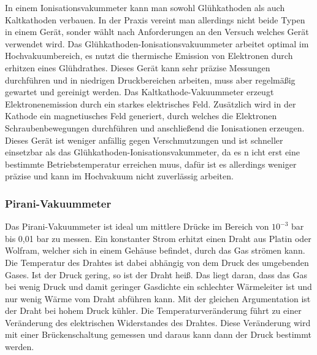 In einem Ionisationsvakummeter kann man sowohl Glühkathoden als auch Kaltkathoden verbauen. In der Praxis 
vereint man allerdings nicht  beide Typen in einem Gerät, sonder wählt nach Anforderungen an den Versuch welches
Gerät verwendet wird. Das Glühkathoden-Ionisationsvakuummeter arbeitet optimal im Hochvakuumbereich, es nutzt die thermische Emission von Elektronen
durch erhitzen eines Glühdrathes. Dieses Gerät kann sehr präzise Messungen durchführen und in niedrigen Druckbereichen arbeiten,
muss aber regelmäßig gewartet und gereinigt werden. Das Kaltkathode-Vakuummeter erzeugt Elektronenemission durch ein starkes elektrisches Feld.
Zusätzlich wird in der Kathode ein magnetiusches Feld generiert, durch welches die Elektronen Schraubenbewegungen durchführen und anschließend die
Ionisationen  erzeugen. Dieses Gerät ist weniger anfällig gegen Verschmutzungen und ist schneller einsetzbar als das Glühkathoden-Ionisationsvakummeter,
da es n icht erst eine bestimmte Betriebstemperatur erreichen muus, dafür ist es allerdings weniger präzise und kann im Hochvakuum nicht zuverlässig arbeiten.


\subsubsection{Pirani-Vakuummeter}
Das Pirani-Vakuummeter ist ideal um mittlere Drücke im Bereich von $10^{-3}$ bar bis 0,01 bar zu messen.
Ein konstanter Strom erhitzt einen Draht aus Platin oder Wolfram, welcher sich in einem Gehäuse befindet, durch das Gas strömen kann.
Die Temperatur des Drahtes ist dabei abhängig von dem Druck des umgebenden Gases. Ist der Druck gering, so ist der Draht heiß.
Das liegt daran, dass das Gas bei wenig Druck und damit geringer Gasdichte ein schlechter Wärmeleiter ist und nur wenig Wärme vom 
Draht abführen kann. Mit der gleichen Argumentation ist der Draht bei hohem Druck kühler. Die Temperaturveränderung führt zu einer Veränderung
des elektrischen Widerstandes des Drahtes. Diese Veränderung wird mit einer Brückenschaltung gemessen und daraus kann dann der Druck bestimmt werden.


